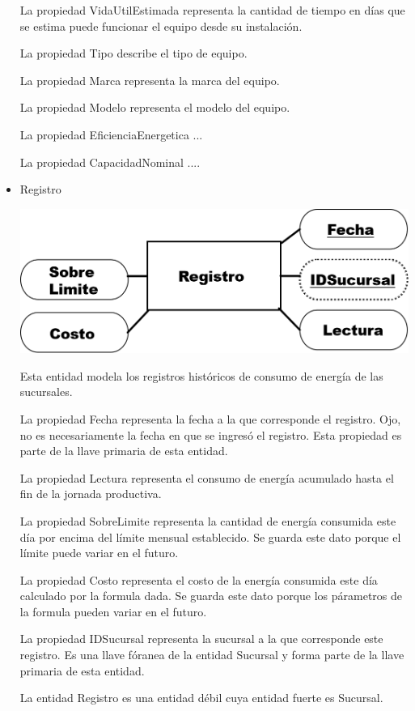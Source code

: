 \documentclass{article}
\begin{document}
\begin{itemize}
La propiedad VidaUtilEstimada representa la cantidad de tiempo en días que se estima puede funcionar el equipo desde su instalación.

La propiedad Tipo describe el tipo de equipo.

La propiedad Marca representa la marca del equipo.

La propiedad Modelo representa el modelo del equipo.

La propiedad EficienciaEnergetica ...

La propiedad CapacidadNominal ....

\item Registro

\includegraphics[scale=0.5]{Imagenes/Informe1/EntidadRegistro.png}

Esta entidad modela los registros históricos de consumo de energía de las sucursales.

La propiedad Fecha representa la fecha a la que corresponde el registro. Ojo, no es necesariamente la fecha en que se ingresó el registro. Esta propiedad es parte de la llave primaria de esta entidad.

La propiedad Lectura representa el consumo de energía acumulado hasta el fin de la jornada productiva.

La propiedad SobreLimite representa la cantidad de energía consumida este día por encima del límite mensual establecido. Se guarda este dato porque el límite puede variar en el futuro.

La propiedad Costo representa el costo de la energía consumida este día calculado por la formula dada. Se guarda este dato porque los párametros de la formula pueden variar en el futuro.

La propiedad IDSucursal representa la sucursal a la que corresponde este registro. Es una llave fóranea de la entidad Sucursal y forma parte de la llave primaria de esta entidad.

La entidad Registro es una entidad débil cuya entidad fuerte es Sucursal.
\end{itemize}
\end{document}
